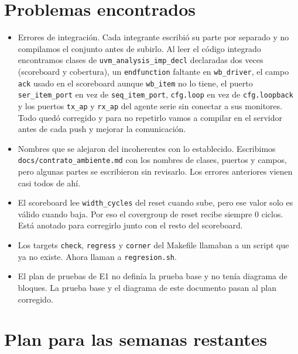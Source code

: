 \documentclass[11pt,letterpaper]{article}
\newcommand{\cod}[1]{\texttt{#1}}
\begin{document}
\section{Problemas encontrados}\label{sec:problemas}

\begin{itemize}
\item Errores de integración. Cada integrante escribió su parte por separado y no compilamos el conjunto antes de subirlo. Al leer el código integrado encontramos clases de \cod{uvm\_analysis\_imp\_decl} declaradas dos veces (scoreboard y cobertura), un \cod{endfunction} faltante en \cod{wb\_driver}, el campo \cod{ack} usado en el scoreboard aunque \cod{wb\_item} no lo tiene, el puerto \cod{ser\_item\_port} en vez de \cod{seq\_item\_port}, \cod{cfg.loop} en vez de \cod{cfg.loopback} y los puertos \cod{tx\_ap} y \cod{rx\_ap} del agente serie sin conectar a sus monitores. Todo quedó corregido y para no repetirlo vamos a compilar en el servidor antes de cada push y mejorar la comunicación.
\item Nombres que se alejaron del incoherentes con lo establecido. Escribimos \cod{docs/contrato\_ambiente.md} con los nombres de clases, puertos y campos, pero algunas partes se escribieron sin revisarlo. Los errores anteriores vienen casi todos de ahí.
\item El scoreboard lee \cod{width\_cycles} del reset cuando sube, pero ese valor solo es válido cuando baja. Por eso el covergroup de reset recibe siempre 0 ciclos. Está anotado para corregirlo junto con el resto del scoreboard.
\item Los targets \cod{check}, \cod{regress} y \cod{corner} del Makefile llamaban a un script que ya no existe. Ahora llaman a \cod{regresion.sh}.
\item El plan de pruebas de E1 no definía la prueba base y no tenía diagrama de bloques. La prueba base y el diagrama de este documento pasan al plan corregido.
\end{itemize}

\section{Plan para las semanas restantes}
\end{document}
